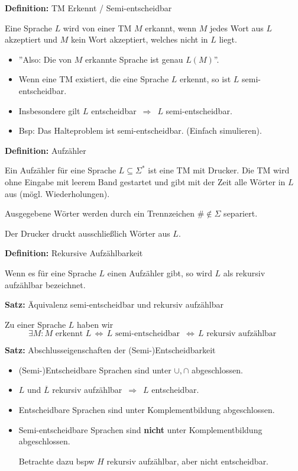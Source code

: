 \documentclass[a4paper,graphics,11pt]{article}
\newcommand{\Iff}[0]{\,\Longleftrightarrow\,}
\begin{document}
\textbf{Definition:} TM Erkennt / Semi-entscheidbar

Eine Sprache $L$ wird von einer TM $M$ erkannt, wenn $M$ jedes Wort aus $L$ akzeptiert
und $M$ kein Wort akzeptiert, welches nicht in $L$ liegt.
\begin{itemize}
    \item ''Also: Die von $M$ erkannte Sprache ist genau $L(M)$''.
    \item Wenn eine TM existiert, die eine Sprache $L$ erkennt, so ist $L$ semi-entscheidbar.
    \item Insbesondere gilt $L$ entscheidbar $\,\Longrightarrow\,$ $L$ semi-entscheidbar.
    \item Bsp: Das Halteproblem ist semi-entscheidbar. (Einfach simulieren).
\end{itemize}

\strut

\textbf{Definition:} Aufzähler

Ein Aufzähler für eine Sprache $L \subseteq \Sigma^*$ ist eine TM mit Drucker.
Die TM wird ohne Eingabe mit leerem Band gestartet und gibt mit der Zeit alle Wörter in $L$
aus (mögl. Wiederholungen).

Ausgegebene Wörter werden durch ein Trennzeichen $\# \notin \Sigma$ separiert.

Der Drucker druckt ausschließlich Wörter aus $L$.

\strut

\textbf{Definition:} Rekursive Aufzählbarkeit

Wenn es für eine Sprache $L$ einen Aufzähler gibt,
so wird $L$ als rekursiv aufzählbar bezeichnet.

\strut

\textbf{Satz:} Äquivalenz semi-entscheidbar und rekursiv aufzählbar

Zu einer Sprache $L$ haben wir
$$
    \exists M: M \text{ erkennt } L
    \Iff L \text{ semi-entscheidbar }
    \Iff L \text{ rekursiv aufzählbar }
$$

\newpage

\textbf{Satz:} Abschlusseigenschaften der (Semi-)Entscheidbarkeit
\begin{itemize}
    \item (Semi-)Entscheidbare Sprachen sind unter $\cup,\cap$ abgeschlossen.
    \item $L$ und $\overline{L}$ rekursiv aufzählbar $\,\Longrightarrow\,$ $L$ entscheidbar.
    \item Entscheidbare Sprachen sind unter Komplementbildung abgeschlossen.
    \item Semi-entscheidbare Sprachen sind \textbf{nicht} unter Komplementbildung abgeschlossen.

        Betrachte dazu bspw $H$ rekursiv aufzählbar, aber nicht entscheidbar.
\end{itemize}
\end{document}
